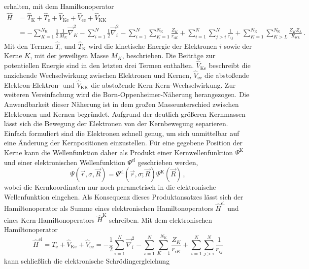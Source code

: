 erhalten, mit dem Hamiltonoperator
\begin{equation}
\begin{aligned}
  \hat{H}&=\hat{T}_{\text{K}}+\hat{T}_{\text{e}}+\hat{V}_{\text{Ke}}+\hat{V}_{\text{ee}}+\hat{V}_{\text{KK}}\\
  &=-\sum_{K=1}^{N_\text{K}}\frac{1}{2}\frac{1}{M_K}\vec{\nabla}^2_K-\sum_{i=1}^N\frac{1}{2}\vec{\nabla}^2_i-\sum_{i=1}^N\sum_{K=1}^{N_\text{K}}\frac{Z_K}{r_{iK}}+\sum_{i=1}^N\sum_{j>i}^N\frac{1}{r_{ij}}+\sum_{K=1}^{N_\text{K}}\sum_{K>L}^{N_\text{K}}\frac{Z_KZ_L}{R_{KL}}\, .
\end{aligned}
\end{equation}
Mit den Termen $\hat{T}_{\text{e}}$ und $\hat{T}_{\text{K}}$ wird die kinetische Energie der Elektronen $i$ sowie der Kerne $K$, mit der jeweiligen Masse $M_K$, beschrieben. Die Beiträge zur potentiellen Energie sind in den letzten drei Termen enthalten. $\hat{V}_{\text{Ke}}$ beschreibt die anziehende Wechselwirkung zwischen Elektronen und Kernen, $\hat{V}_{\text{ee}}$ die abstoßende Elektron-Elektron- und $\hat{V}_{\text{KK}}$ die abstoßende Kern-Kern-Wechselwirkung.
Zur weiteren Vereinfachung wird die Born-Oppenheimer-Näherung\supercite{born1927quantentheorie} herangezogen. Die Anwendbarkeit dieser Näherung ist in dem großen Masseunterschied zwischen Elektronen und Kernen begründet. Aufgrund der deutlich größeren Kernmassen lässt sich die Bewegung der Elektronen von der Kernbewegung separieren. Einfach formuliert sind die Elektronen schnell genug, um sich unmittelbar auf eine Änderung der Kernpositionen einzustellen. Für eine gegebene Position der Kerne kann die Wellenfunktion daher als Produkt einer Kernwellenfunktion $\Psi^{\text{K}}$ und einer elektronischen Wellenfunktion $\Psi^{\text{el}}$ geschrieben werden,
\begin{equation}
\Psi(\vec{r},\sigma,\vec{R})=\Psi^{\text{el}}(\vec{r},\sigma;\vec{R})\Psi^{\text{K}}(\vec{R})\, ,
\end{equation}
wobei die Kernkoordinaten nur noch parametrisch in die elektronische Wellenfunktion eingehen. Als Konsequenz dieses Produktansatzes lässt sich der Hamiltonoperator als Summe eines elektronischen Hamiltonoperators $\hat{H}^{\text{el}}$ und eines Kern-Hamiltonoperators $\hat{H}^{\text{K}}$ schreiben. Mit dem elektronischen Hamiltonoperator
\begin{equation}\label{eq:elhamilton}
  \hat{H}^{\text{el}}=\hat{T}_{\text{e}}+\hat{V}_{\text{Ke}}+\hat{V}_{\text{ee}}=-\frac{1}{2}\sum_{i=1}^N\vec{\nabla}^2_i-\sum_{i=1}^N\sum_{K=1}^{N_\text{K}}\frac{Z_K}{r_{iK}}+\sum_{i=1}^N\sum_{j>i}^N\frac{1}{r_{ij}}
\end{equation}
kann schließlich die elektronische Schrödingergleichung 

